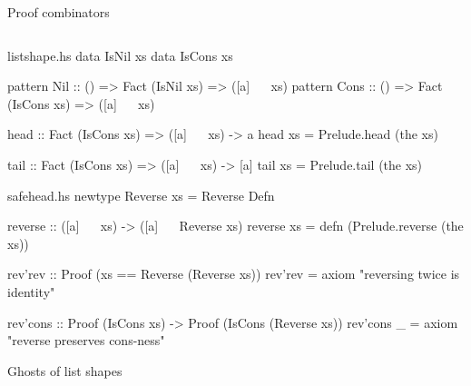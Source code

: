 \documentclass{beamer}
\begin{document}
\begin{frame}{Proof combinators}
\inputminted{haskell}{gdp-comb.hs}
\end{frame}

\begin{filecontents*}{listshape.hs}
data IsNil  xs
data IsCons xs  

pattern Nil  :: () => Fact (IsNil  xs) => ([a] ~~ xs)
pattern Cons :: () => Fact (IsCons xs) => ([a] ~~ xs)

head :: Fact (IsCons xs) => ([a] ~~ xs) ->  a
head xs = Prelude.head (the xs)

tail :: Fact (IsCons xs) => ([a] ~~ xs) -> [a]
tail xs = Prelude.tail (the xs)
\end{filecontents*}

\begin{filecontents*}{safehead.hs}
newtype Reverse xs = Reverse Defn

reverse :: ([a] ~~ xs) -> ([a] ~~ Reverse xs)
reverse xs = defn (Prelude.reverse (the xs))

rev'rev  :: Proof (xs == Reverse (Reverse xs))
rev'rev = axiom "reversing twice is identity"

rev'cons ::
  Proof (IsCons xs) -> Proof (IsCons (Reverse xs))
rev'cons _ = axiom "reverse preserves cons-ness"
\end{filecontents*}

\begin{frame}{Ghosts of list shapes}
\inputminted{haskell}{listshape.hs}
\end{frame}
\end{document}
